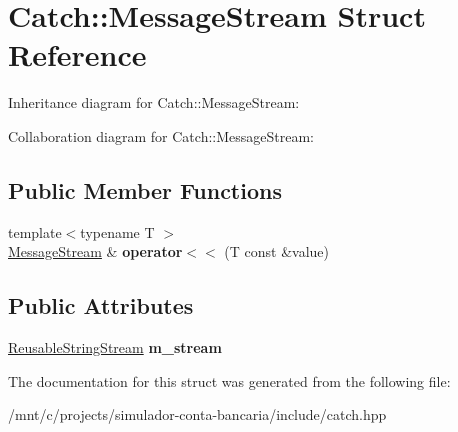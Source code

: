 \hypertarget{structCatch_1_1MessageStream}{}\section{Catch\+:\+:Message\+Stream Struct Reference}
\label{structCatch_1_1MessageStream}


Inheritance diagram for Catch\+:\+:Message\+Stream\+:


Collaboration diagram for Catch\+:\+:Message\+Stream\+:
\subsection*{Public Member Functions}
\begin{DoxyCompactItemize}
\item 
\mbox{\label{structCatch_1_1MessageStream_a554c4aff5925a077e9fe9d858217428d}} 
{\footnotesize template$<$typename T $>$ }\\\hyperlink{structCatch_1_1MessageStream}{Message\+Stream} \& {\bfseries operator$<$$<$} (T const \&value)
\end{DoxyCompactItemize}
\subsection*{Public Attributes}
\begin{DoxyCompactItemize}
\item 
\mbox{\label{structCatch_1_1MessageStream_a9202520faed8882ef469db9f353ec578}} 
\hyperlink{classCatch_1_1ReusableStringStream}{Reusable\+String\+Stream} {\bfseries m\+\_\+stream}
\end{DoxyCompactItemize}


The documentation for this struct was generated from the following file\+:\begin{DoxyCompactItemize}
\item 
/mnt/c/projects/simulador-\/conta-\/bancaria/include/catch.\+hpp\end{DoxyCompactItemize}
